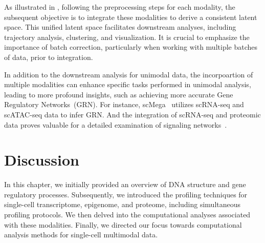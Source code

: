  


As illustrated in , following the preprocessing steps for each modality, the subsequent objective is to integrate these modalities to derive a consistent latent space. This unified latent space facilitates downstream analyses, including trajectory analysis, clustering, and visualization. It is crucial to emphasize the importance of batch correction, particularly when working with multiple batches of data, prior to integration.

In addition to the downstream analysis for unimodal data, the incorpoartion of multiple modalities can enhance specific tasks performed in unimodal analysis, leading to more profound insights, such as achieving more accurate Gene Regulatory Networks~(GRN). For instance, scMega~\citep{li2023scmega} utilizes scRNA-seq and scATAC-seq data to infer GRN. And the integration of scRNA-seq and proteomic data proves valuable for a detailed examination of signaling networks~\citep{heumos2023best}.




\section{Discussion}
\label{background:Discussion}
In this chapter, we initially provided an overview of DNA structure and gene regulatory processes. Subsequently, we introduced the profiling techniques for single-cell transcriptome, epigenome, and proteome, including simultaneous profiling protocols. We then delved into the computational analyses associated with these modalities. Finally, we directed our focus towards computational analysis methods for single-cell multimodal data. 
